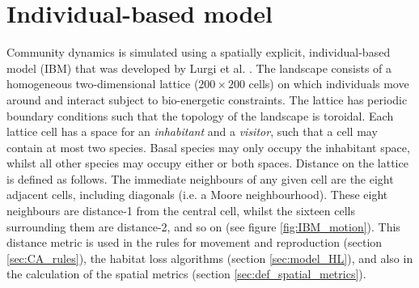 \section{Individual-based model}
\label{sec:the_model}


Community dynamics is simulated using a spatially explicit, individual-based model (IBM) that was developed by Lurgi et al. \cite{lurgi2015efffects}. The landscape consists of a homogeneous two-dimensional lattice ($200 \times 200$ cells) on which individuals move around and interact subject to bio-energetic constraints. The lattice has periodic boundary conditions such that the topology of the landscape is toroidal. Each lattice cell has a space for an \emph{inhabitant} and a \emph{visitor}, such that a cell may contain at most two species. Basal species may only occupy the inhabitant space, whilst all other species may occupy either or both spaces. Distance on the lattice is defined as follows. The immediate neighbours of any given cell are the eight adjacent cells, including diagonals (i.e. a Moore neighbourhood). These eight neighbours are distance-1 from the central cell, whilst the sixteen cells surrounding them are distance-2, and so on (see figure \ref{fig:IBM_motion}). This distance metric is used in the rules for movement and reproduction (section \ref{sec:CA_rules}), the habitat loss algorithms (section \ref{sec:model_HL}), and also in the calculation of the spatial metrics (section \ref{sec:def_spatial_metrics}).



